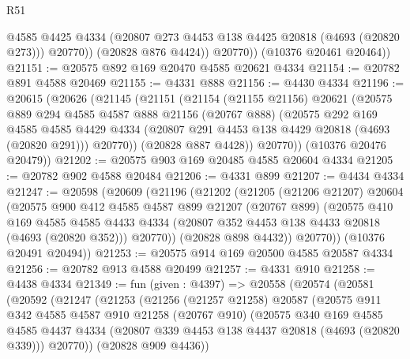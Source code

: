\begin{lexlean}{R51}
\begin{coremodule}
                @4585
                @4425
                @4334
                (@20807 @273 @4453 @138 @4425 @20818 (@4693 (@20820 @273)))
                @20770))
            (@20828 @876 @4424))
          @20770))
      (@10376 @20461 @20464))
@21151 := @20575 @892 @169 @20470 @4585 @20621 @4334
@21154 := @20782 @891 @4588 @20469
@21155 := @4331 @888
@21156 := @4430 @4334
@21196 := @20615
    (@20626
      (@21145
        (@21151
          (@21154
            (@21155 @21156)
            @20621
            (@20575
              @889
              @294
              @4585
              @4587
              @888
              @21156
              (@20767 @888)
              (@20575
                @292
                @169
                @4585
                @4585
                @4429
                @4334
                (@20807 @291 @4453 @138 @4429 @20818 (@4693 (@20820 @291)))
                @20770))
            (@20828 @887 @4428))
          @20770))
      (@10376 @20476 @20479))
@21202 := @20575 @903 @169 @20485 @4585 @20604 @4334
@21205 := @20782 @902 @4588 @20484
@21206 := @4331 @899
@21207 := @4434 @4334
@21247 := @20598
    (@20609
      (@21196
        (@21202
          (@21205
            (@21206 @21207)
            @20604
            (@20575
              @900
              @412
              @4585
              @4587
              @899
              @21207
              (@20767 @899)
              (@20575
                @410
                @169
                @4585
                @4585
                @4433
                @4334
                (@20807 @352 @4453 @138 @4433 @20818 (@4693 (@20820 @352)))
                @20770))
            (@20828 @898 @4432))
          @20770))
      (@10376 @20491 @20494))
@21253 := @20575 @914 @169 @20500 @4585 @20587 @4334
@21256 := @20782 @913 @4588 @20499
@21257 := @4331 @910
@21258 := @4438 @4334
@21349 := fun (given : @4397) =>
  @20558
    (@20574
      (@20581
        (@20592
          (@21247
            (@21253
              (@21256
                (@21257 @21258)
                @20587
                (@20575
                  @911
                  @342
                  @4585
                  @4587
                  @910
                  @21258
                  (@20767 @910)
                  (@20575
                    @340
                    @169
                    @4585
                    @4585
                    @4437
                    @4334
                    (@20807 @339 @4453 @138 @4437 @20818 (@4693 (@20820 @339)))
                    @20770))
                (@20828 @909 @4436))

\end{coremodule}
\end{lexlean}
